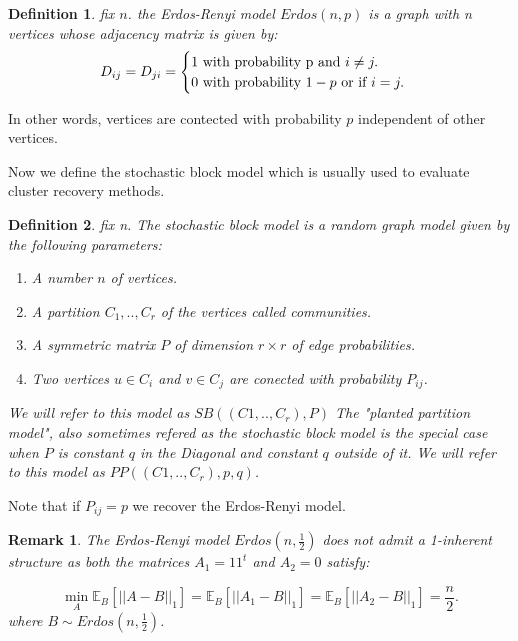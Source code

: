 \documentclass[12pt]{amsart}
\newtheorem{definition}{Definition}
\newtheorem{remark}[lemma]{Remark}
\numberwithin{equation}{section}
\newcommand{\EE}{\mathbb{E}}
\begin{document}
\begin{definition}
fix $n$. the Erdos-Renyi model $Erdos(n,p)$ is a graph with n vertices whose adjacency matrix is given by:
\[
D_{ij}=D_{ji}=\begin{cases}
1 \text{ with probability p and } i \neq j. \cr
0 \text{ with probability }1-p \text{ or if } i=j.
\end{cases}
\]
\end{definition}
In other words, vertices are contected with probability $p$ independent of other vertices.


Now we define the stochastic block model which is usually used to evaluate cluster recovery methods.


\begin{definition}
fix n. The stochastic block model is a random graph model given by the following parameters:

\begin{enumerate}
\item A number $n$ of vertices.
\item A partition $C_1,..,C_r$ of the vertices called communities.
\item A symmetric matrix $P$ of dimension $r\times r$ of edge probabilities.
\item Two vertices $u \in C_i$ and $v \in C_j$ are conected with probability $P_{ij}$.
\end{enumerate}
We will refer to this model as
$SB((C1,..,C_r),P)$
The "planted partition model", also sometimes refered as the stochastic block model is the special case when $P$ is constant $q$ in the Diagonal and constant $q$ outside of it. We will refer to this model as $PP((C1,..,C_r),p,q)$.
\end{definition}
Note that if $P_{ij}=p$ we recover the Erdos-Renyi model.

\begin{remark}
The Erdos-Renyi model $Erdos(n,\frac{1}{2})$ does not admit a 1-inherent structure as  both the matrices 
$A_1=11^t$ and $A_2=0$ satisfy:

\[
\min_A \EE_B\left[||A-B||_1\right]= \EE_B\left[||A_1-B||_1\right]=\EE_B\left[||A_2-B||_1\right]=\frac{n}{2}.
\]
where $B \sim Erdos(n,\frac{1}{2})$.
\end{remark}
\end{document}
